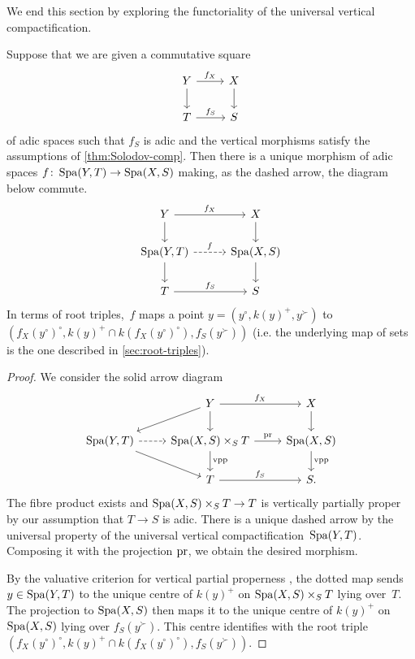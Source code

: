 We end this section by exploring the functoriality of the universal vertical compactification.

\begin{prop} \label{prop:Spa-functoriality}
Suppose that we are given a commutative square
\[
 \begin{tikzcd}
     Y     \ar[r,"f_X"]   \ar[d]  & X   \ar[d]  \\
     T      \ar[r,"f_S"]          & S
 \end{tikzcd}
\]
of adic spaces such that $f_S$ is adic and the vertical morphisms satisfy the assumptions of \cref{thm:Solodov-comp}.
Then there is a unique morphism of adic spaces $f \colon \operatorname{Spa}(Y,T) \to \operatorname{Spa}(X,S)$ making, as the dashed arrow, the diagram below commute.
\[
 \begin{tikzcd}[column sep= 1cm]
     Y          \ar[r,"f_X"]   \ar[d]  & X   \ar[d]  \\
     \Spa(Y,T)  \ar[r,dashed,"f"] \ar[d] & \Spa(X,S) \ar[d] \\
     T          \ar[r,"f_S"]          & S
 \end{tikzcd}
\]
In terms of root triples,~$f$ maps a point $y = (y^\circ,k(y)^+,y^\succ)$ to $(f_X(y^\circ)^\circ,k(y)^+ \cap k(f_X(y^\circ)^\circ),f_S(y^\succ))$ (i.e. the underlying map of sets is the one described in \cref{sec:root-triples}).
\end{prop}

\begin{proof}
    We consider the solid arrow diagram
    \[
    \begin{tikzcd}
    & Y \ar[dl] \ar[d] \ar[r,"f_X"] & X \ar[d] \\
    \Spa(Y,T) \ar[r,dashed] \ar[dr] & \Spa(X,S) \times_S T \ar[r,"\pr"] \ar[d,"\rm vpp"] & \Spa(X,S) \ar[d,"\rm vpp"] \\
    & T \ar[r,"f_S"] & S.
    \end{tikzcd}
    \]
    The fibre product exists and $\operatorname{Spa}(X,S) \times_S T \to T$ is vertically partially proper by our assumption that $T \to S$ is adic.
    There is a unique dashed arrow by the universal property of the universal vertical compactification~$\operatorname{Spa}(Y,T)$.
    Composing it with the projection $\operatorname{pr}$,
    we obtain the desired morphism.
    
    By the valuative criterion for vertical partial properness \cite{Bauer:valuative-criteria}, the dotted map sends $y \in \operatorname{Spa}(Y,T)$ to the unique centre of $k(y)^+$ on $\operatorname{Spa}(X,S) \times_S T$ lying over~$T$.
    The projection to $\operatorname{Spa}(X,S)$ then maps it to the unique centre of $k(y)^+$ on $\operatorname{Spa}(X,S)$ lying over $f_S(y^\succ)$.
    This centre identifies with the root triple $(f_X(y^\circ)^\circ,k(y)^+ \cap k(f_X(y^\circ)^\circ),f_S(y^\succ))$.
\end{proof}

